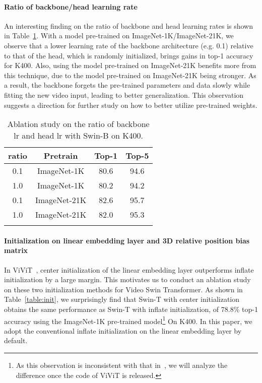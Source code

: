 \documentclass{article}
\begin{document}
\paragraph{Ratio of backbone/head learning rate} An interesting finding on the ratio of backbone and head learning rates is shown in Table~\ref{tab:lr}.
With a model pre-trained on ImageNet-1K/ImageNet-21K, we observe that a lower learning rate of the backbone architecture (e.g. 0.1) relative to that of the head, which is randomly initialized, brings gains in top-1 accuracy for K400. 
Also, using the model pre-trained on ImageNet-21K benefits more from this technique, due to the model pre-trained on ImageNet-21K being stronger. 
As a result, the backbone forgets the pre-trained parameters and data slowly while fitting the new video input, leading to better generalization. This observation suggests a direction for further study on how to better utilize pre-trained weights.

\begin{table}[h]
    \centering
    \caption{Ablation study on the ratio of backbone lr and head lr with Swin-B on K400.}
\centering
  \begin{tabular}{cc|cc}
  \Xhline{1.0pt}
  ratio  & Pretrain & Top-1 & Top-5 \\
  \hline
   0.1 & ImageNet-1K & 80.6 & 94.6\\
   1.0 & ImageNet-1K & 80.2 & 94.2\\
   0.1 & ImageNet-21K & 82.6 & 95.7\\
   1.0 & ImageNet-21K & 82.0 & 95.3\\
  \Xhline{1.0pt}
  \end{tabular}
  \label{tab:lr}
\end{table}


\paragraph{Initialization on linear embedding layer and 3D relative position bias matrix} In ViViT~\cite{arnab2021vivit}, center initialization of the linear embedding layer outperforms inflate initialization by a large margin. This motivates us to conduct an ablation study on these two initialization methods for Video Swin Transformer. 
As shown in Table~\ref{table:init}, we surprisingly find that Swin-T with center initialization obtains the same performance as Swin-T with inflate initialization, of 78.8\% top-1 accuracy using the ImageNet-1K pre-trained model\footnote{As this observation is inconsistent with that in~\cite{arnab2021vivit}, we will analyze the difference once the code of ViViT is released.} On K400.
In this paper, we adopt the conventional inflate initialization on the linear embedding layer by default.
\end{document}
